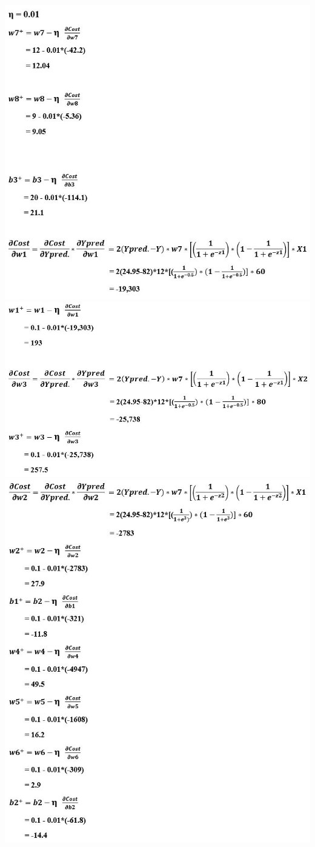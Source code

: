 \documentclass{article}
\begin{document}
\begin{center}
    \includegraphics[width=0.66\linewidth]{Back Propagation_Equi1.JPG}\\
    \includegraphics[width=0.85\linewidth]{Back Propagation_Equi2.JPG}\\
    \includegraphics[width=0.85\linewidth]{Back Propagation_Equi3.JPG}
\end{center}
\end{document}
